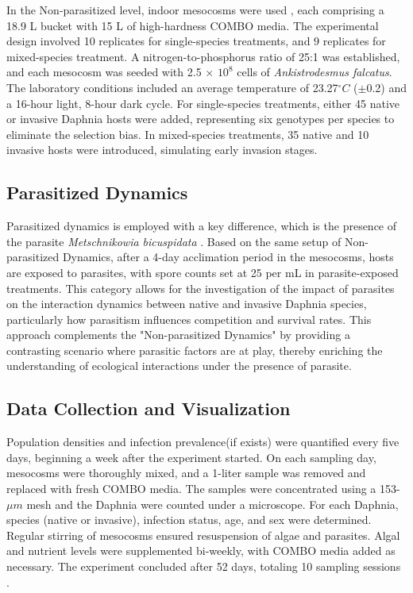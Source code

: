 \documentclass[12pt]{article}
\begin{document}
In the Non-parasitized level, indoor mesocosms were used \cite{Searle2016}, each comprising a 18.9 L bucket with 15 L of high-hardness COMBO media. The experimental design involved 10 replicates for single-species treatments, and 9 replicates for mixed-species treatment. A nitrogen-to-phosphorus ratio of 25:1 was established, and each mesocosm was seeded with 2.5 $\times$ $10^8$ cells of \textit{Ankistrodesmus falcatus}. The laboratory conditions included an average temperature of 23.27$^\circ C$ ($\pm$0.2) and a 16-hour light, 8-hour dark cycle. For single-species treatments, either 45 native or invasive Daphnia hosts were added, representing six genotypes per species to eliminate the selection bias. In mixed-species treatments, 35 native and 10 invasive hosts were introduced, simulating early invasion stages.\\

\subsection{Parasitized Dynamics}
Parasitized dynamics is employed with a key difference, which is the presence of the parasite \textit{Metschnikowia bicuspidata} . Based on the same setup of Non-parasitized Dynamics, after a 4-day acclimation period in the mesocosms, hosts are exposed to parasites, with spore counts set at 25 per mL in parasite-exposed treatments. This category allows for the investigation of the impact of parasites on the interaction dynamics between native and invasive Daphnia species, particularly how parasitism influences competition and survival rates. This approach complements the "Non-parasitized Dynamics" by providing a contrasting scenario where parasitic factors are at play, thereby enriching the understanding of ecological interactions under the presence of parasite.\\

\subsection{Data Collection and Visualization}
Population densities and infection prevalence(if exists) were quantified every five days, beginning a week after the experiment started. On each sampling day, mesocosms were thoroughly mixed, and a 1-liter sample was removed and replaced with fresh COMBO media. The samples were concentrated using a 153-$\mu m$ mesh and the Daphnia were counted under a microscope. For each Daphnia, species (native or invasive), infection status, age, and sex were determined. Regular stirring of mesocosms ensured resuspension of algae and parasites. Algal and nutrient levels were supplemented bi-weekly, with COMBO media added as necessary. The experiment concluded after 52 days, totaling 10 sampling sessions \cite{Searle2016}.\\
\end{document}
